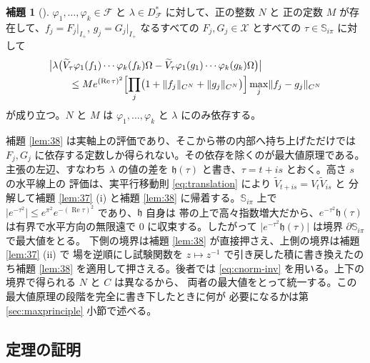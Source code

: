 \documentclass[11pt,a4paper]{article}
\newcommand{\Fields}{\mathcal{F}}
\newcommand{\Xcl}{\mathcal{X}}
\newcommand{\Strip}{\mathbb{S}}
\newcommand{\Vt}{\widetilde{V}}
\newcommand{\Dom}{D}
\newcommand{\CN}[1]{\lVert #1 \rVert_{C^{N}}}
\newcommand{\Dstar}{\Dom^{*}_{\Fields}}
\theoremstyle{definition}
\newtheorem{lemma}[theorem]{補題}
\newcommand{\srcnum}[1]{\renewcommand{\thetheorem}{#1}}
\begin{document}
\srcnum{3.9}
\begin{lemma}[\cite{T26}]
\label{lem:39}
$\varphi_1, \dots, \varphi_k \in \Fields$ と $\lambda \in \Dstar$ に対して、正の整数 $N$ と
正の定数 $M$ が存在して、$f_j = F_j|_{I_+}$, $g_j = G_j|_{I_+}$ なるすべての
$F_j, G_j \in \Xcl$ とすべての $\tau \in \Strip_{i\pi}$ に対して
\[
  \begin{aligned}
    &\bigl\lvert \lambda\bigl(\Vt_\tau \varphi_1(f_1)\cdots\varphi_k(f_k)\Omega
      - \Vt_\tau \varphi_1(g_1)\cdots\varphi_k(g_k)\Omega\bigr)\bigr\rvert \\
    &\qquad \le M e^{(\operatorname{Re}\tau)^2}
      \Bigl[\prod_{j} \bigl(1 + \CN{f_j} + \CN{g_j}\bigr)\Bigr] \max_j \CN{f_j - g_j}
  \end{aligned}
\]
が成り立つ。$N$ と $M$ は $\varphi_1, \dots, \varphi_k$ と $\lambda$ にのみ依存する。
\end{lemma}

補題 \ref{lem:38} は実軸上の評価であり、そこから帯の内部へ持ち上げただけでは
$F_j, G_j$ に依存する定数しか得られない。その依存を除くのが最大値原理である。
主張の左辺、すなわち $\lambda$ の値の差を $\mathfrak{h}(\tau)$ と書き、$\tau = t + is$ とおく。高さ $s$ の水平線上の
評価は、実平行移動則 \eqref{eq:translation} により $\Vt_{t+is} = V_t \Vt_{is}$ と
分解して補題 \ref{lem:37} (i) と補題 \ref{lem:38} に帰着する。$\Strip_{i\pi}$ 上で
$\lvert e^{-\tau^2}\rvert \le e^{\pi^2} e^{-(\operatorname{Re}\tau)^2}$ であり、$\mathfrak{h}$ 自身は
帯の上で高々指数増大だから、$e^{-\tau^2}\mathfrak{h}(\tau)$ は有界で水平方向の無限遠で
$0$ に収束する。したがって
$\lvert e^{-\tau^2}\mathfrak{h}(\tau)\rvert$ は境界 $\partial\Strip_{i\pi}$ で最大値をとる。
下側の境界は補題 \ref{lem:38} が直接押さえ、上側の境界は補題 \ref{lem:37} (ii) で
場を逆順にし試験関数を $z \mapsto z^{-1}$ で引き戻した積に書き換えたのち補題 \ref{lem:38} を適用して押さえる。後者では
\eqref{eq:cnorm-inv} を用いる。上下の境界で得られる $N$ と $C$ は異なるから、
両者の最大値をとって統一する。この最大値原理の段階を完全に書き下したときに何が
必要になるかは第 \ref{sec:maxprinciple} 小節で述べる。

\subsection{定理の証明}
\end{document}
